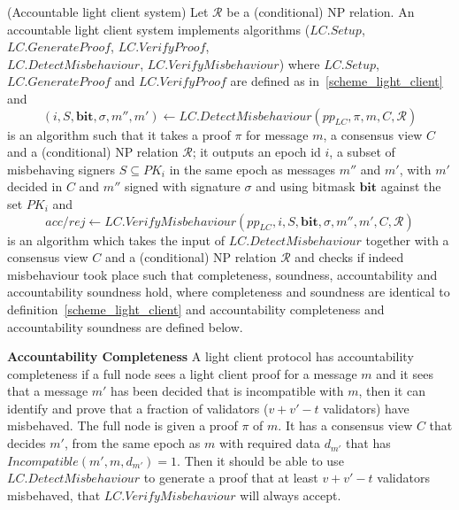 \begin{dfn}(Accountable light client system)  
\label{def:lc_accountable}
Let $\mathcal{R}$ be a (conditional) NP relation. An accountable light client 
system implements algorithms ($\mathit{LC.Setup}$, $\mathit{LC.GenerateProof}$, $\mathit{LC.VerifyProof}$, \\
$\mathit{LC.DetectMisbehaviour}$, $\mathit{LC.VerifyMisbehaviour}$) where 
$\mathit{LC.Setup}$, $\mathit{LC.GenerateProof}$ and $\mathit{LC.VerifyProof}$ are 
defined as in~\ref{scheme_light_client} and 
$$(i, S, \mathbf{bit}, \sigma, m'', m') \leftarrow \mathit{LC.DetectMisbehaviour}(\mathit{pp_{\mathit{LC}}}, \pi, m, C,\mathcal{R})$$ 
is an algorithm such that it takes a proof $\pi$ for message $m$, a consensus view $C$ and a (conditional) NP relation $\mathcal{R}$;
it outputs an epoch id $i$, a subset of misbehaving signers $S \subseteq \mathit{PK_i}$ in the same epoch as messages $m''$ and $m'$, 
with $m'$ decided in $C$ and $m''$ signed with signature $\sigma$ and using bitmask $\mathbf{bit}$ against the set $\mathit{PK_i}$ 
and
$$ \mathit{acc}/\mathit{rej} \leftarrow \mathit{LC.VerifyMisbehaviour}(\mathit{pp_{\mathit{LC}}}, i, S, \mathbf{bit}, \sigma, m'', m', C, \mathcal{R})$$ 
is an algorithm which takes the input of $\mathit{LC.DetectMisbehaviour}$ together with a consensus view $C$ and a (conditional) NP relation $\mathcal{R}$ and 
checks if indeed misbehaviour took place such that completeness, soundness, accountability and accountability soundness hold, where completeness and soundness 
are identical to definition~\ref{scheme_light_client} and accountability completeness and accountability soundness are defined below.
\end{dfn}

\noindent \textbf{Accountability Completeness} A light client protocol has accountability completeness if a full node sees a light client proof for a message $m$ and it sees that a message $m'$ has been decided that is incompatible with $m$, then it can identify and prove that a fraction of validators ($v+v'-t$ validators) have misbehaved.
The full node is given a proof $\pi$ of $m$. It has  a consensus view $C$ that decides $m'$, from the same epoch as $m$ with required data $d_{m'}$ that has $\mathit{Incompatible}(m', m, d_{m'})=1$.
Then it should be able to use $\mathit{LC.DetectMisbehaviour}$ to generate a proof that at least $v+v'-t$ validators misbehaved, that $\mathit{LC.VerifyMisbehaviour}$ will always accept.

